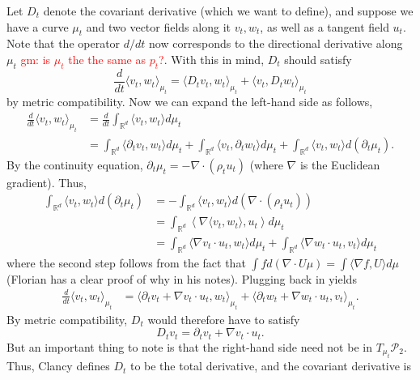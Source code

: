 \documentclass{article}
\begin{document}
Let $D_t$ denote the covariant derivative (which we want to define), and suppose we have a curve $\mu_t$ and two vector fields along it $v_t, w_t$, as well as a tangent field $u_t$. Note that the operator $d/dt$ now corresponds to the directional derivative along $\mu_t$ \textcolor{red}{gm: is $\mu_t$ the the same as $p_t$?}. With this in mind, $D_t$ should satisfy 
\[\frac{d}{dt}\langle v_t, w_t\rangle_{\mu_t} = \langle D_tv_t, w_t\rangle_{\mu_t} + \langle v_t, D_tw_t\rangle_{\mu_t}\]
by metric compatibility. Now we can expand the left-hand side as follows,
\begin{align}
    \frac{d}{dt}\langle v_t, w_t\rangle_{\mu_t} &= \frac{d}{dt}\int_{\mathbb{R}^d}\langle v_t, w_t\rangle d\mu_t \\
    &= \int_{\mathbb{R}^d}\langle \partial_t v_t, w_t\rangle d\mu_t + \int_{\mathbb{R}^d}\langle v_t, \partial _tw_t\rangle d\mu_t + \int_{\mathbb{R}^d}\langle v_t, w_t\rangle d(\partial_t\mu_t).
\end{align}
By the continuity equation, $\partial_t\mu_t = -\nabla \cdot (\rho_tu_t)$ (where $\nabla$ is the Euclidean gradient). Thus,
\begin{align}
    \int_{\mathbb{R}^d}\langle v_t, w_t\rangle d(\partial_t\mu_t) &= -\int_{\mathbb{R}^d}\langle v_t, w_t\rangle d(\nabla \cdot (\rho_tu_t)) \\
    &= \int_{\mathbb{R}^d} \left\langle \nabla \langle v_t, w_t\rangle, u_t\right\rangle  d\mu_t \\
    &= \int_{\mathbb{R}^d} \langle   \nabla v_t \cdot u_t, w_t\rangle d\mu_t   +\int_{\mathbb{R}^d}\langle  \nabla w_t \cdot  u_t , v_t\rangle  d\mu_t 
\end{align}
where the second step follows from the fact that $\int f d(\nabla\cdot U\mu) = \int\langle\nabla f, U\rangle d\mu$ (Florian has a clear proof of why in his notes). Plugging back in yields
\begin{align}
    \frac{d}{dt}\langle v_t, w_t\rangle_{\mu_t} &= \langle\partial_tv_t + \nabla v_t \cdot u_t, w_t\rangle_{\mu_t} + \langle \partial_tw_t + \nabla w_t\cdot u_t, v_t\rangle_{\mu_t}.
\end{align}
By metric compatibility, $D_t$ would therefore have to satisfy
\begin{equation}
    D_tv_t = \partial_tv_t + \nabla v_t \cdot u_t.
\end{equation}
But an important thing to note is that the right-hand side need not be in $T_{\mu_t}\mathcal{P}_2$. Thus, Clancy defines $D_t$ to be the total derivative, and the covariant derivative is
\end{document}
